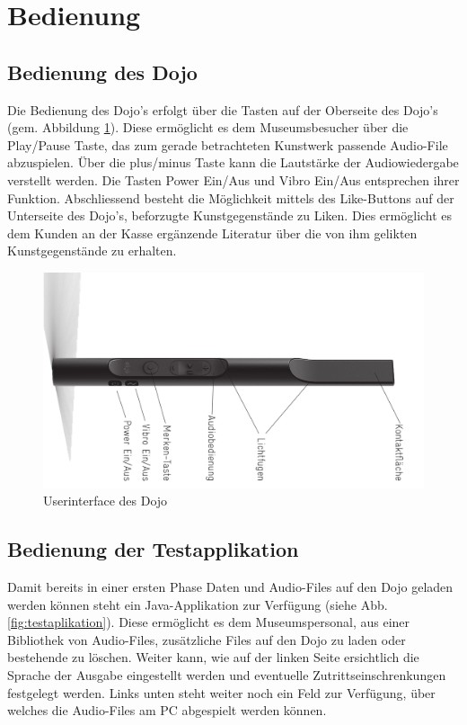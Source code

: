 \documentclass[10pt,a4paper,oneside]{99_fhnwreport}
\begin{document}
\section{Bedienung}\label{sec:bedienung}
\subsection{Bedienung des Dojo}
Die Bedienung des Dojo's erfolgt über die Tasten auf der Oberseite des Dojo's (gem. Abbildung \ref{fig:dojointerface}). Diese ermöglicht es dem Museumsbesucher über die Play/Pause Taste, das zum gerade betrachteten Kunstwerk passende Audio-File abzuspielen. Über die plus/minus Taste kann die Lautstärke der Audiowiedergabe verstellt werden. Die Tasten Power Ein/Aus und Vibro Ein/Aus entsprechen ihrer Funktion. Abschliessend besteht die Möglichkeit mittels des Like-Buttons auf der Unterseite des Dojo's, beforzugte Kunstgegenstände zu Liken. Dies ermöglicht es dem Kunden an der Kasse ergänzende Literatur über die von ihm gelikten Kunstgegenstände zu erhalten.

\begin{figure}[htb]
\includegraphics[width=\textwidth]{dojointerface.png}
\caption{Userinterface des Dojo \cite{DOJO}} %
\label{fig:dojointerface}
\end{figure}

\subsection{Bedienung der Testapplikation}
Damit bereits in einer ersten Phase Daten und Audio-Files auf den Dojo geladen werden können steht ein Java-Applikation zur Verfügung (siehe Abb. \ref{fig:testaplikation}). Diese ermöglicht es dem Museumspersonal, aus einer Bibliothek von Audio-Files, zusätzliche Files auf den Dojo zu laden oder bestehende zu löschen. Weiter kann, wie auf der linken Seite ersichtlich die Sprache der Ausgabe eingestellt werden und eventuelle Zutrittseinschrenkungen festgelegt werden. Links unten steht weiter noch ein Feld zur Verfügung, über welches die Audio-Files am PC abgespielt werden können.
\end{document}
